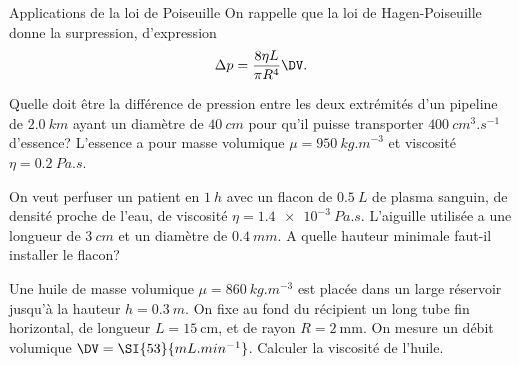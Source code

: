 \begin{exo}[PC][1][appli]{Applications de la loi de Poiseuille}
On rappelle que la loi de Hagen-Poiseuille donne la surpression, d'expression 
\begin{equation}
\Delta p =\frac{8 \eta L}{\pi R^4} \DV.
\end{equation}
\begin{enonce}
  Quelle doit être la différence de pression entre les deux extrémités d'un pipeline de $\SI{2.0}{km}$ ayant un diamètre de $\SI{40}{cm}$ pour qu'il puisse transporter $\SI{400}{cm^3.s^{-1}}$ d'essence? L’essence a pour masse volumique $\mu=\SI{950}{kg.m}^{-3}$ et viscosité $\eta=\SI{0.2}{Pa.s}$.\dotfill

\end{enonce}

\begin{enonce}
  On veut perfuser un patient en $\SI{1}{h}$ avec un flacon de $\SI{0.5}{L}$ de plasma sanguin, de densité proche de l'eau, de viscosité $\eta=\SI{1.4e-3}{Pa.s}$. 
  L'aiguille utilisée a une longueur de $\SI{3}{cm}$ et un diamètre de $\SI{0.4}{mm}$. A quelle hauteur minimale faut-il installer le flacon?\dotfill


\end{enonce}

\begin{enonce}
  Une huile de masse volumique $\mu=\SI{860}{kg.m^{-3}}$ est placée dans un large réservoir jusqu'à la hauteur $h=\SI{0.3}{m}$. On fixe au fond du récipient un long tube fin horizontal, de longueur $L=15 \mathrm{~cm}$, et de rayon $R=2 \mathrm{~mm}$. On mesure un débit volumique $\DV=\SI{53}{mL.min^{-1}}$. Calculer la viscosité de l'huile.\dotfill


\end{enonce}
\end{exo}

